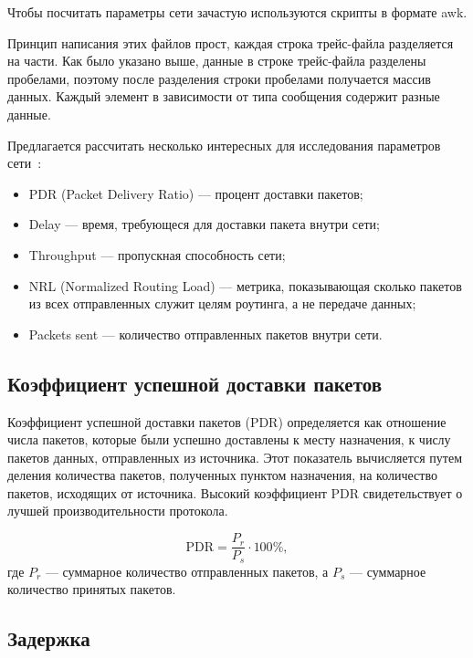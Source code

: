 Чтобы посчитать параметры сети зачастую используются скрипты в формате awk. 

Принцип написания этих файлов прост, каждая строка трейс-файла разделяется на части. Как было указано выше, данные в строке трейс-файла разделены пробелами, поэтому после разделения строки пробелами получается массив данных. Каждый элемент в зависимости от типа сообщения содержит разные данные. 

Предлагается рассчитать несколько интересных для исследования параметров сети~\cite{taneja2011evaluation}:

\begin{itemize}
  \item PDR (Packet Delivery Ratio) --- процент доставки пакетов;
  \item Delay --- время, требующеся для доставки пакета внутри сети;
  \item Throughput --- пропускная способность сети;
  \item NRL (Normalized Routing Load) --- метрика, показывающая сколько пакетов из всех отправленных служит целям роутинга, а не передаче данных;
  \item Packets sent --- количество отправленных пакетов внутри сети.
\end{itemize}

\subsection{Коэффициент успешной доставки пакетов}

Коэффициент успешной доставки пакетов (PDR) определяется как отношение числа пакетов, которые были успешно доставлены к месту назначения, к числу пакетов данных, отправленных из источника. Этот показатель вычисляется путем деления количества пакетов, полученных пунктом назначения, на количество пакетов, исходящих от источника. Высокий коэффициент PDR свидетельствует о лучшей производительности протокола.

\begin{equation}
  \label{eq:pdr_calculation}
  \text{PDR} = \frac{P_r}{P_s} \cdot 100\%,
\end{equation}
где $P_r$ --- суммарное количество отправленных пакетов, а $P_s$ --- суммарное количество принятых пакетов.

\subsection{Задержка}

